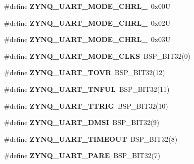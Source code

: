 \begin{DoxyCompactItemize}
\#define {\bfseries Z\+Y\+N\+Q\+\_\+\+U\+A\+R\+T\+\_\+\+M\+O\+D\+E\+\_\+\+C\+H\+R\+L\+\_}~0x00U
\item 
\mbox{\label{zynq-uart-regs_8h_aa478560b265e8589f1a5b016d71e4426}} 
\#define {\bfseries Z\+Y\+N\+Q\+\_\+\+U\+A\+R\+T\+\_\+\+M\+O\+D\+E\+\_\+\+C\+H\+R\+L\+\_}~0x02U
\item 
\mbox{\label{zynq-uart-regs_8h_a231bc1c373f8cf2af4ce09590ceab6b3}} 
\#define {\bfseries Z\+Y\+N\+Q\+\_\+\+U\+A\+R\+T\+\_\+\+M\+O\+D\+E\+\_\+\+C\+H\+R\+L\+\_}~0x03U
\item 
\mbox{\label{zynq-uart-regs_8h_a2edb7cb3be7087f319858932dbba7da7}} 
\#define {\bfseries Z\+Y\+N\+Q\+\_\+\+U\+A\+R\+T\+\_\+\+M\+O\+D\+E\+\_\+\+C\+L\+KS}~B\+S\+P\+\_\+\+B\+I\+T32(0)
\item 
\mbox{\label{zynq-uart-regs_8h_a365075b013cafbbf78b5b8e88fc17c70}} 
\#define {\bfseries Z\+Y\+N\+Q\+\_\+\+U\+A\+R\+T\+\_\+\+T\+O\+VR}~B\+S\+P\+\_\+\+B\+I\+T32(12)
\item 
\mbox{\label{zynq-uart-regs_8h_abedd0b2b94954b0674baf62b2f9719aa}} 
\#define {\bfseries Z\+Y\+N\+Q\+\_\+\+U\+A\+R\+T\+\_\+\+T\+N\+F\+UL}~B\+S\+P\+\_\+\+B\+I\+T32(11)
\item 
\mbox{\label{zynq-uart-regs_8h_afb4aace2d0bf6f51362c408a88700532}} 
\#define {\bfseries Z\+Y\+N\+Q\+\_\+\+U\+A\+R\+T\+\_\+\+T\+T\+R\+IG}~B\+S\+P\+\_\+\+B\+I\+T32(10)
\item 
\mbox{\label{zynq-uart-regs_8h_a2f443428d2f6baa9ab00cc8933ac27fb}} 
\#define {\bfseries Z\+Y\+N\+Q\+\_\+\+U\+A\+R\+T\+\_\+\+D\+M\+SI}~B\+S\+P\+\_\+\+B\+I\+T32(9)
\item 
\mbox{\label{zynq-uart-regs_8h_afba06a1315c4f16854eae3fe6cf5f0f4}} 
\#define {\bfseries Z\+Y\+N\+Q\+\_\+\+U\+A\+R\+T\+\_\+\+T\+I\+M\+E\+O\+UT}~B\+S\+P\+\_\+\+B\+I\+T32(8)
\item 
\mbox{\label{zynq-uart-regs_8h_a08e1070c94a0cebb9ed45c52076d1dd4}} 
\#define {\bfseries Z\+Y\+N\+Q\+\_\+\+U\+A\+R\+T\+\_\+\+P\+A\+RE}~B\+S\+P\+\_\+\+B\+I\+T32(7)

\end{DoxyCompactItemize}
